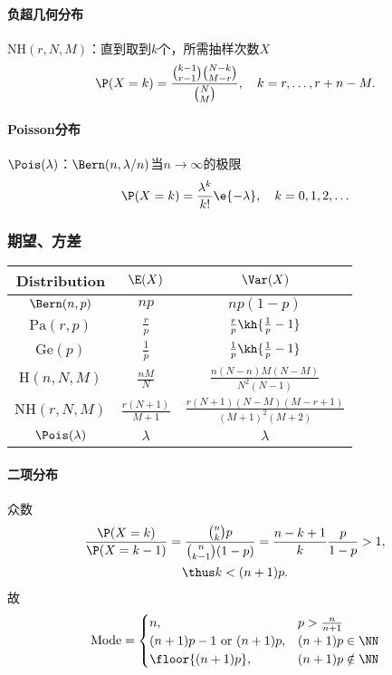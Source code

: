 \paragraph{负超几何分布}$\mathrm{NH}(r,N,M)$：直到取到$k$个，所需抽样次数$X$
\begin{align}
	\P(X=k)=\frac{{k-1\choose r-1}{N-k\choose M-r}}{{N\choose M}},\quad k=r,\ldots,r+n-M.
\end{align}
\paragraph{Poisson分布}$\Pois(\lambda)$：$\Bern(n,\lambda/n)$当$n\to\infty$的极限
\begin{align}
	\P(X=k)=\frac{\lambda^k}{k!}\e{-\lambda},\quad k=0,1,2,\ldots
\end{align}
\subsubsection{期望、方差}
\begin{center}
	\begin{tabular}{c|c|c}
		\toprule
		Distribution&$\E(X)$&$\Var(X)$\\
		\midrule
		$\Bern(n,p)$&$np$&$np(1-p)$\\
		\midrule
		$\mathrm{Pa}(r,p)$&$\frac rp$&$\frac rp\kh{\frac1p-1}$\\
		\midrule
		$\mathrm{Ge}(p)$&$\frac1p$&$\frac1p\kh{\frac1p-1}$\\
		\midrule
		$\mathrm H(n,N,M)$&$\frac{nM}N$&$\frac{n(N-n)M(N-M)}{N^2(N-1)}$\\
		\midrule
		$\mathrm{NH}(r,N,M)$&$\frac{r(N+1)}{M+1}$&$\frac{r(N+1)(N-M)(M-r+1)}{(M+1)^2(M+2)}$\\
		\midrule
		$\Pois(\lambda)$&$\lambda$&$\lambda$\\
		\bottomrule
	\end{tabular}
\end{center}
\paragraph{二项分布}众数
\begin{gather*}
	\frac{\P(X=k)}{\P(X=k-1)}=\frac{{n\choose k}p}{{n\choose k-1}(1-p)}=\frac{n-k+1}{k}\frac p{1-p}>1,\\
	\thus k<(n+1)p.
\end{gather*}
故
\begin{align*}
	\text{Mode}=\begin{cases}
		n,&p>\frac{n}{n+1}\\
		(n+1)p-1\text{~or~}(n+1)p,&(n+1)p\in\NN\\
		\floor{(n+1)p},&(n+1)p\notin\NN
	\end{cases}
\end{align*}

